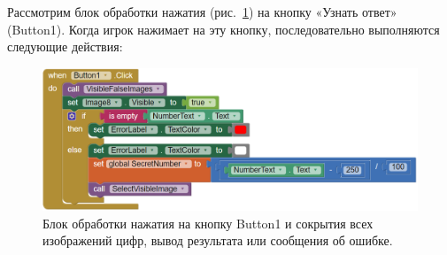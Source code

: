 Рассмотрим блок обработки нажатия (рис.~\ref{fig:block:button:click}) на кнопку «Узнать ответ» (Button1).
Когда игрок нажимает на эту кнопку, последовательно выполняются следующие действия:
\begin{figure}
  \includegraphics{./graphics/programs/guess_numbers/block_Button1Click_AppInventor_2018.png}
    \caption[Блок обработки нажатия на кнопку Button1.]{Блок обработки нажатия на кнопку Button1 и сокрытия всех изображений цифр, вывод результата или сообщения об ошибке.}
  \label{fig:block:button:click}
\end{figure}
